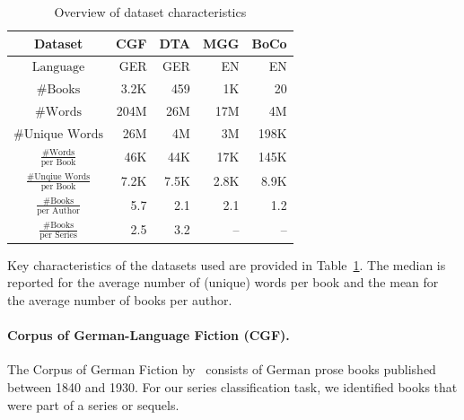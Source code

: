 \documentclass[11pt]{article}
\begin{document}
\begin{table}
	\centering
	\begin{tabular}{crrrr}
		\toprule
		Dataset                                			& CGF  & DTA  & MGG  & BoCo  \\
		\midrule
		$\text{Language}$                               	& GER  & GER  & EN   & EN   \\[0.2em]
		$\text{\# Books}$                               	& 3.2K & 459  & 1K   & 20   \\[0.2em]
		$\text{\# Words}$                               	& 204M & 26M  & 17M  & 4M   \\[0.2em]
		$\text{\# Unique Words}$                        	& 26M  & 4M   & 3M   & 198K \\[0.2em]
		$\frac{\text{\# Words}}{\text{per Book}}$	 	& 46K  & 44K  & 17K  & 145K \\[0.2em]
		$\frac{\text{\# Unqiue Words}}{\text{per Book}}$	& 7.2K & 7.5K & 2.8K & 8.9K \\[0.2em]
		$\frac{\text{\# Books}}{\text{per Author}}$     	& 5.7  & 2.1  & 2.1  & 1.2  \\
		$\frac{\text{\# Books}}{\text{per Series}}$     	& 2.5  & 3.2  & --  & --  \\
		\bottomrule
	\end{tabular}
	\caption[Overview of Dataset Characteristics]{Overview of dataset characteristics}
	\label{tab:datasets_overview}
\end{table}

Key characteristics of the datasets used are provided in Table~\ref{tab:datasets_overview}.
The median is reported for the average number of (unique) words per book and the mean for the average number of books per author.

\paragraph{Corpus of German-Language Fiction (CGF).}
The Corpus of German Fiction by~\citet{fischer_corpus_2017} consists of  German prose books published between 1840 and 1930.
For our series classification task, we identified  books that were part of a series or sequels.
\end{document}
